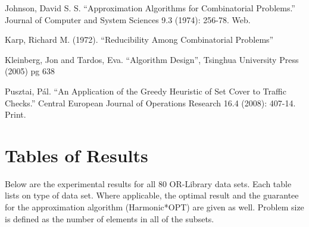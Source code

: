 \maketitle
\tableofcontents
\cleardoublepage

\setcounter{page}{1}


\printbibliography

Johnson, David S. S. ``Approximation Algorithms for Combinatorial Problems.'' Journal of Computer and System Sciences 9.3 (1974): 256-78. Web.\vspace{\bibitemsep}

Karp, Richard M. (1972). ``Reducibility Among Combinatorial Problems''\vspace{\bibitemsep}

Kleinberg, Jon and Tardos, Eva. ``Algorithm Design'', Tsinghua University Press (2005) pg 638\vspace{\bibitemsep}

Pusztai, Pál. ``An Application of the Greedy Heuristic of Set Cover to Traffic Checks.'' Central European Journal of Operations Research 16.4 (2008): 407-14. Print.\vspace{\bibitemsep}

\appendix
\chapter{Tables of Results}

Below are the experimental results for all 80 OR-Library data sets. Each table lists on type of data set. Where applicable, the optimal result and the guarantee for the approximation algorithm (Harmonic*OPT) are given as well. Problem size is defined as the number of elements in all of the subsets.

